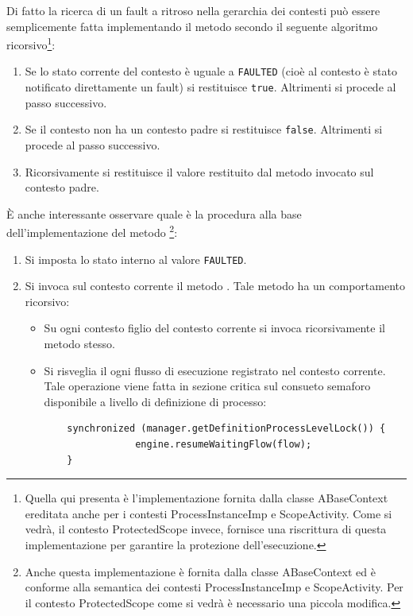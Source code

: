 Di fatto la ricerca di un fault a ritroso nella gerarchia dei contesti può
essere semplicemente fatta implementando il metodo 
secondo il seguente algoritmo ricorsivo\footnote{Quella qui presenta \`e
l'implementazione fornita dalla classe ABaseContext ereditata anche per i
contesti ProcessInstanceImp e ScopeActivity. Come si vedrà, il contesto
ProtectedScope invece, fornisce una riscrittura di questa implementazione per
garantire la protezione dell'esecuzione.}:

\begin{enumerate}
  \item Se lo stato corrente del contesto \`e uguale a \texttt{FAULTED} (cioè
  al contesto \`e stato notificato direttamente un fault) si restituisce
  \texttt{true}. Altrimenti si procede al passo successivo.
  \item Se il contesto non ha un contesto padre si restituisce \texttt{false}.
  Altrimenti si procede al passo successivo.
  \item Ricorsivamente si restituisce il valore restituito dal metodo 
   invocato sul contesto padre.
\end{enumerate}

\`E anche interessante osservare quale è la procedura alla
base dell'implementazione del metodo \footnote{Anche questa implementazione \`e fornita dalla classe ABaseContext ed \`e conforme
alla semantica dei contesti ProcessInstanceImp e ScopeActivity. Per il contesto
ProtectedScope come si vedrà è necessario una piccola modifica.}:

\begin{enumerate}
  \item Si imposta lo stato interno al valore \texttt{FAULTED}.
  \item Si invoca sul contesto corrente il metodo .
  Tale metodo ha un comportamento ricorsivo:
  \begin{itemize}
  	\item  Su ogni contesto figlio del contesto corrente si invoca ricorsivamente
  	il metodo  stesso.
  	\item Si risveglia il ogni flusso di esecuzione registrato nel contesto
  	corrente. Tale operazione viene fatta in sezione critica sul consueto
  	semaforo disponibile a livello di definizione di processo:
	\begin{lstlisting}
	synchronized (manager.getDefinitionProcessLevelLock()) {
                engine.resumeWaitingFlow(flow);
    }
  	\end{lstlisting}	  	 
  \end{itemize}
\end{enumerate}

